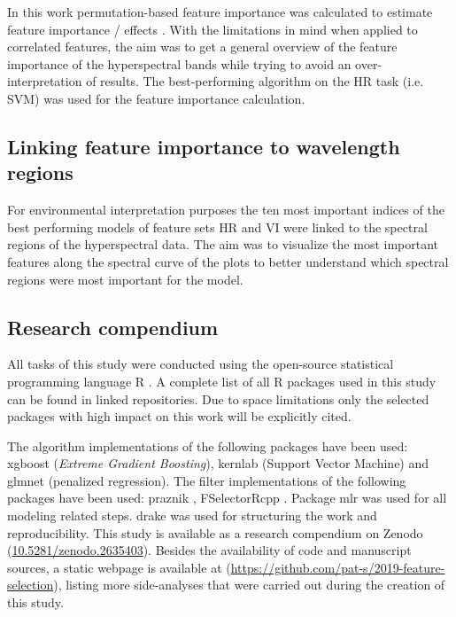 \documentclass[final]{IEEEtran}
\begin{document}
In this work permutation-based feature importance was calculated to estimate feature importance / effects \cite{apley2019}.
With the limitations in mind when applied to correlated features, the aim was to get a general overview of the feature importance of the hyperspectral bands while trying to avoid an over-interpretation of results.
The best-performing algorithm on the HR task (i.e. SVM) was used for the feature importance calculation.

\subsection{Linking feature importance to wavelength regions}

For environmental interpretation purposes the ten most important indices of the best performing models of feature sets HR and VI were linked to the spectral regions of the hyperspectral data.
The aim was to visualize the most important features along the spectral curve of the plots to better understand which spectral regions were most important for the model.

\subsection{Research compendium}

All tasks of this study were conducted using the open-source statistical programming language R \cite{rcoreteam2019}.
A complete list of all R packages used in this study can be found in linked repositories.
Due to space limitations only the selected packages with high impact on this work will be explicitly cited.

The algorithm implementations of the following packages have been used: xgboost \cite{chen2016} (\textit{Extreme Gradient Boosting}), kernlab \cite{kernlab} (Support Vector Machine) and glmnet \cite{glmnet} (penalized regression).
The filter implementations of the following packages have been used: praznik \cite{praznik}, FSelectorRcpp \cite{fselectorrcpp}.
Package mlr \cite{mlr} was used for all modeling related steps.
drake \cite{drake} was used for structuring the work and reproducibility.
This study is available as a research compendium on Zenodo (\url{10.5281/zenodo.2635403}).
Besides the availability of code and manuscript sources, a static webpage is available at (\url{https://github.com/pat-s/2019-feature-selection}), listing more side-analyses that were carried out during the creation of this study.
\end{document}
